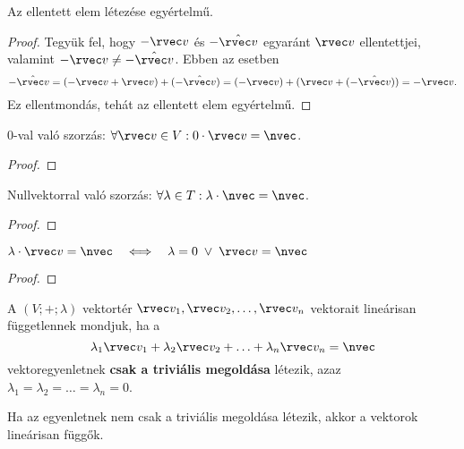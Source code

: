 \begin{statement}
  Az ellentett elem létezése egyértelmű.

  \begin{proof}
    Tegyük fel, hogy $-\rvec v$ és $-\hat{\rvec v}$ egyaránt
    $\rvec v$ ellentettjei, valamint $-\rvec v \neq -\hat{\rvec v}$.
    Ebben az esetben
    $$
      -\hat{\rvec v}
      = (-\rvec v + \rvec v) + (-\hat{\rvec v})
      = (-\rvec v) + (\rvec v + (-\hat{\rvec v}))
      = -\rvec v
      \text.
    $$
    Ez ellentmondás, tehát az ellentett elem egyértelmű.
  \end{proof}
\end{statement}

\begin{statement}
  0-val való szorzás:
  $\forall \rvec v \in V: 0 \cdot \rvec v = \nvec$.

  \begin{proof}
    \vspace{4em}
  \end{proof}
\end{statement}

\begin{statement}
  Nullvektorral való szorzás:
  $\forall \lambda \in T: \lambda \cdot \nvec = \nvec$.

  \begin{proof}
    \vspace{4em}
  \end{proof}
\end{statement}

\begin{statement}
  $\lambda \cdot \rvec v = \nvec \quad \Longleftrightarrow \quad
    \lambda = 0 \; \lor \; \rvec v = \nvec$

  \begin{proof}
    \vspace{4em}
  \end{proof}
\end{statement}

\begin{definition}
  A $(V; +; \lambda)$ vektortér $\rvec v_1, \rvec v_2, \ldots, \rvec v_n$
  vektorait lineárisan függetlennek mondjuk, ha a
  $$
    \lambda_1 \rvec v_1
    + \lambda_2 \rvec v_2
    + \ldots
    + \lambda_n \rvec v_n
    = \nvec
  $$
  vektoregyenletnek \textbf{csak a triviális megoldása} létezik, azaz
  $\lambda_1 = \lambda_2 = \ldots = \lambda_n = 0$.

  Ha az egyenletnek nem csak a triviális megoldása létezik, akkor a vektorok
  lineárisan függők.
\end{definition}

